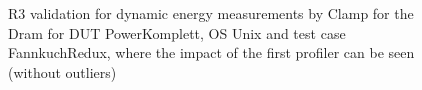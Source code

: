 \begin{figure}
                            \caption{R3 validation for dynamic energy measurements by Clamp for the Dram for DUT PowerKomplett, OS Unix and test case FannkuchRedux, where the impact of the first profiler can be seen (without outliers)} \label{fig:PowerKomplett_Clamp_Dram_R3_dynamic_energy_without_outliers_Unix_avg_watts}
                            \end{figure}
                            